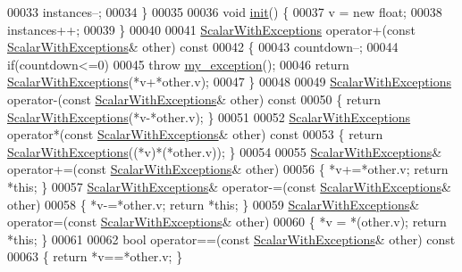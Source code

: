 \begin{DoxyCode}
00033       instances--;
00034     \}
00035 
00036     \textcolor{keywordtype}{void} \hyperlink{structinit}{init}() \{
00037       v = \textcolor{keyword}{new} float;
00038       instances++;
00039     \}
00040 
00041     \hyperlink{class_scalar_with_exceptions}{ScalarWithExceptions} operator+(\textcolor{keyword}{const} 
      \hyperlink{class_scalar_with_exceptions}{ScalarWithExceptions}& other)\textcolor{keyword}{ const}
00042 \textcolor{keyword}{    }\{
00043       countdown--;
00044       \textcolor{keywordflow}{if}(countdown<=0)
00045         \textcolor{keywordflow}{throw} \hyperlink{structmy__exception}{my\_exception}();
00046       \textcolor{keywordflow}{return} \hyperlink{class_scalar_with_exceptions}{ScalarWithExceptions}(*v+*other.v);
00047     \}
00048     
00049     \hyperlink{class_scalar_with_exceptions}{ScalarWithExceptions} operator-(\textcolor{keyword}{const} 
      \hyperlink{class_scalar_with_exceptions}{ScalarWithExceptions}& other)\textcolor{keyword}{ const}
00050 \textcolor{keyword}{    }\{ \textcolor{keywordflow}{return} \hyperlink{class_scalar_with_exceptions}{ScalarWithExceptions}(*v-*other.v); \}
00051     
00052     \hyperlink{class_scalar_with_exceptions}{ScalarWithExceptions} operator*(\textcolor{keyword}{const} 
      \hyperlink{class_scalar_with_exceptions}{ScalarWithExceptions}& other)\textcolor{keyword}{ const}
00053 \textcolor{keyword}{    }\{ \textcolor{keywordflow}{return} \hyperlink{class_scalar_with_exceptions}{ScalarWithExceptions}((*v)*(*other.v)); \}
00054     
00055     \hyperlink{class_scalar_with_exceptions}{ScalarWithExceptions}& operator+=(\textcolor{keyword}{const} 
      \hyperlink{class_scalar_with_exceptions}{ScalarWithExceptions}& other)
00056     \{ *v+=*other.v; \textcolor{keywordflow}{return} *\textcolor{keyword}{this}; \}
00057     \hyperlink{class_scalar_with_exceptions}{ScalarWithExceptions}& operator-=(\textcolor{keyword}{const} 
      \hyperlink{class_scalar_with_exceptions}{ScalarWithExceptions}& other)
00058     \{ *v-=*other.v; \textcolor{keywordflow}{return} *\textcolor{keyword}{this}; \}
00059     \hyperlink{class_scalar_with_exceptions}{ScalarWithExceptions}& operator=(\textcolor{keyword}{const} 
      \hyperlink{class_scalar_with_exceptions}{ScalarWithExceptions}& other)
00060     \{ *v = *(other.v); \textcolor{keywordflow}{return} *\textcolor{keyword}{this}; \}
00061   
00062     \textcolor{keywordtype}{bool} operator==(\textcolor{keyword}{const} \hyperlink{class_scalar_with_exceptions}{ScalarWithExceptions}& other)\textcolor{keyword}{ const}
00063 \textcolor{keyword}{    }\{ \textcolor{keywordflow}{return} *v==*other.v; \}

\end{DoxyCode}
